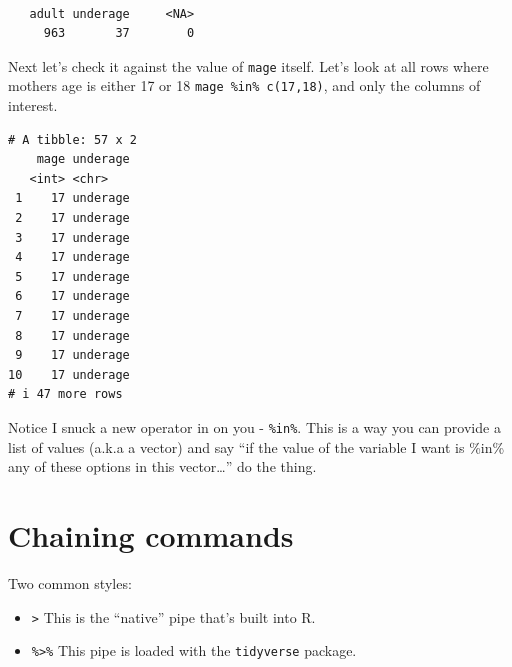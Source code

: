 \documentclass[
  letterpaper,
  DIV=11,
  numbers=noendperiod,
  oneside]{scrreprt}
\newenvironment{Shaded}{\begin{snugshade}}{\end{snugshade}}
\newcommand{\AttributeTok}[1]{\textcolor[rgb]{0.40,0.45,0.13}{#1}}
\newcommand{\DecValTok}[1]{\textcolor[rgb]{0.68,0.00,0.00}{#1}}
\newcommand{\FunctionTok}[1]{\textcolor[rgb]{0.28,0.35,0.67}{#1}}
\newcommand{\NormalTok}[1]{\textcolor[rgb]{0.00,0.23,0.31}{#1}}
\newcommand{\SpecialCharTok}[1]{\textcolor[rgb]{0.37,0.37,0.37}{#1}}
\newcommand{\StringTok}[1]{\textcolor[rgb]{0.13,0.47,0.30}{#1}}
\providecommand{\tightlist}{%
  \setlength{\itemsep}{0pt}\setlength{\parskip}{0pt}}\usepackage{longtable,booktabs,array}
\begin{document}
\begin{Shaded}
\end{Shaded}

\begin{verbatim}

   adult underage     <NA> 
     963       37        0 
\end{verbatim}

Next let's check it against the value of \texttt{mage} itself. Let's
look at all rows where mothers age is either 17 or 18
\texttt{mage\ \%in\%\ c(17,18)}, and only the columns of interest.

\begin{Shaded}
\end{Shaded}

\begin{verbatim}
# A tibble: 57 x 2
    mage underage
   <int> <chr>   
 1    17 underage
 2    17 underage
 3    17 underage
 4    17 underage
 5    17 underage
 6    17 underage
 7    17 underage
 8    17 underage
 9    17 underage
10    17 underage
# i 47 more rows
\end{verbatim}

Notice I snuck a new operator in on you - \texttt{\%in\%}. This is a way
you can provide a list of values (a.k.a a vector) and say ``if the value
of the variable I want is \%in\% any of these options in this
vector\ldots{}'' do the thing.

\section{Chaining commands}\label{chaining-commands}

Two common styles:

\begin{itemize}
\tightlist
\item
  \texttt{\textbar{}\textgreater{}} This is the ``native'' pipe that's
  built into R.
\item
  \texttt{\%\textgreater{}\%} This pipe is loaded with the
  \texttt{tidyverse} package.
\end{itemize}
\end{document}
